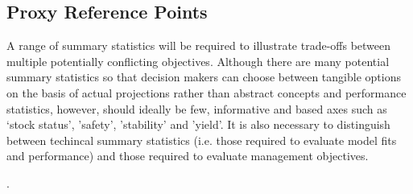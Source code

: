 \subsection{Proxy Reference Points}

A range of summary statistics will be required to illustrate trade-offs between multiple potentially conflicting objectives. Although there are many potential summary statistics so that decision makers can choose between tangible options on the basis of actual projections rather than abstract concepts and performance statistics, however, should ideally be few, informative and based axes such as ‘stock status’, 'safety', 'stability' and 'yield'. It is also necessary to distinguish between techincal summary statistics (i.e. those required to evaluate model fits and performance) and those required to evaluate management objectives.


. 





